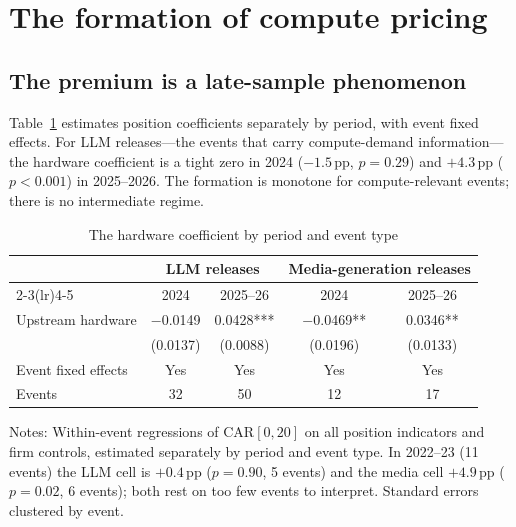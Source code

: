 \documentclass[review,12pt,authoryear]{elsarticle}
\newcommand{\pp}{\,pp}
\begin{document}
\section{The formation of compute pricing}\label{sec:formation}

\subsection{The premium is a late-sample phenomenon}

Table~\ref{tab:phase} estimates position coefficients separately by period,
with event fixed effects. For LLM releases---the events that carry
compute-demand information---the hardware coefficient is a tight zero in
2024 ($-1.5$\pp{}, $p=0.29$) and $+4.3$\pp{} ($p<0.001$) in 2025--2026. The
formation is monotone for compute-relevant events; there is no intermediate
regime.

\begin{table}[t!]
\centering
\begin{threeparttable}
\caption{The hardware coefficient by period and event type}\label{tab:phase}
\small
\begin{tabular}{lcccc}
\toprule
 & \multicolumn{2}{c}{LLM releases} & \multicolumn{2}{c}{Media-generation releases} \\
\cmidrule(lr){2-3}\cmidrule(lr){4-5}
 & 2024 & 2025--26 & 2024 & 2025--26 \\
\midrule
Upstream hardware & $-$0.0149 & 0.0428*** & $-$0.0469** & 0.0346** \\
                  & (0.0137) & (0.0088)  & (0.0196)  & (0.0133) \\
\midrule
Event fixed effects   & Yes & Yes & Yes & Yes \\
Events                & 32  & 50  & 12  & 17 \\
\bottomrule
\end{tabular}
\begin{tablenotes}\footnotesize
\item Notes: Within-event regressions of CAR$[0,20]$ on all position
indicators and firm controls, estimated separately by period and event type.
In 2022--23 (11 events) the LLM cell is $+0.4$\pp{} ($p=0.90$, 5 events)
and the media cell $+4.9$\pp{} ($p=0.02$, 6 events); both rest on too few
events to interpret. Standard errors clustered by event.
\end{tablenotes}
\end{threeparttable}
\end{table}
\end{document}
